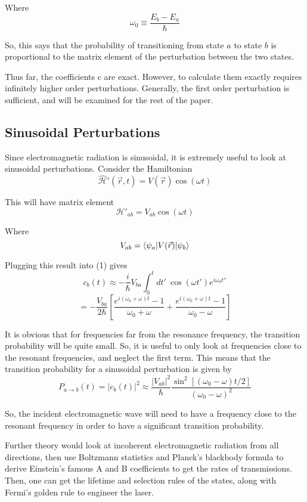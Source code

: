 \documentclass{article}
\renewcommand{\H}{\mathcal{H}}
\begin{document}
Where 
\[ \omega_0 \equiv \frac{E_b - E_a}{\hbar} \]

So, this says that the probability of transitioning from state $a$ to state $b$ is proportional to the matrix element of the perturbation between the two states.

Thus far, the coefficients c are exact. However, to calculate them exactly requires infinitely higher order perturbations. Generally, the first order perturbation is sufficient, and will be examined for the rest of the paper.

\subsection*{Sinusoidal Perturbations}

Since electromagnetic radiation is sinusoidal, it is extremely useful to look at sinusoidal perturbations. Consider the Hamiltonian
\[ \hat{\H}'(\vec{r},t) = V(\vec{r})\cos(\omega t) \]

This will have matrix element 
\[ \H'_{ab} = V_{ab}\cos(\omega t) \]

Where 
\[ V_{ab} = \braket{\psi_a|V(\vec{r})|\psi_b} \]

Plugging this result into (1) gives
\[ c_b(t) \approx -\frac{i}{\hbar}V_{ba}\int_0^tdt'\ \cos(\omega t')e^{i\omega_0t''}  \]
\[ = -\frac{V_{ba}}{2\hbar}\left[ \frac{e^{i(\omega_0+\omega)t}-1}{\omega_0+\omega} + \frac{e^{i(\omega_0+\omega)t}-1}{\omega_0-\omega} \right] \]

It is obvious that for frequencies far from the resonance frequency, the transition probability will be quite small. So, it is useful to only look at frequencies close to the resonant frequencies, and neglect the first term. This means that the transition probability for a sinusoidal perturbation is given by 
\[ P_{a\to b}(t) = |c_b(t)|^2 \approx \frac{|V_{ab}|^2}{\hbar}\frac{\sin^2\left[(\omega_0-\omega)t/2\right]}{(\omega_0-\omega)^2} \]

So, the incident electromagnetic wave will need to have a frequency close to the resonant frequency in order to have a significant transition probability.

Further theory would look at incoherent electromagnetic radiation from all directions, then use Boltzmann statistics and Planck's blackbody formula to derive Einstein's famous A and B coefficients to get the rates of transmissions. Then, one can get the lifetime and selection rules of the states, along with Fermi's golden rule to engineer the laser.
\end{document}
